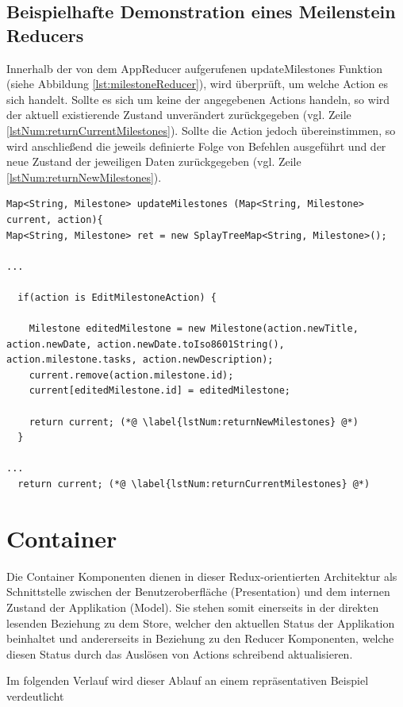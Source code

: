 \documentclass[bibliography=totoc,listof=totoc,BCOR=5mm,DIV=12,oneside]{scrbook}
\begin{document}
\subsection{Beispielhafte Demonstration eines Meilenstein Reducers}

\par Innerhalb der von dem AppReducer aufgerufenen updateMilestones Funktion (siehe Abbildung \ref{lst:milestoneReducer}), wird überprüft, um welche Action es sich handelt. Sollte es sich um keine der angegebenen Actions handeln, so wird der aktuell existierende Zustand unverändert zurückgegeben (vgl. Zeile \ref{lstNum:returnCurrentMilestones}). Sollte die Action jedoch übereinstimmen, so wird anschließend die jeweils definierte Folge von Befehlen ausgeführt und der neue Zustand der jeweiligen Daten zurückgegeben (vgl. Zeile \ref{lstNum:returnNewMilestones}).

\bigskip
\begin{lstlisting}[caption={Meilenstein Reducer Beispiel},captionpos=b, label=lst:milestoneReducer]
Map<String, Milestone> updateMilestones (Map<String, Milestone> current, action){
Map<String, Milestone> ret = new SplayTreeMap<String, Milestone>();

...

  if(action is EditMilestoneAction) {

    Milestone editedMilestone = new Milestone(action.newTitle, action.newDate, action.newDate.toIso8601String(), action.milestone.tasks, action.newDescription);
    current.remove(action.milestone.id);
    current[editedMilestone.id] = editedMilestone;

    return current; (*@ \label{lstNum:returnNewMilestones} @*)
  }
  
...
  return current; (*@ \label{lstNum:returnCurrentMilestones} @*)
\end{lstlisting}
\bigskip

\newpage
\section{Container}
\par Die Container Komponenten dienen in dieser Redux-orientierten Architektur als Schnittstelle zwischen der Benutzeroberfläche (Presentation) und dem internen Zustand der Applikation (Model). Sie stehen somit einerseits in der direkten lesenden Beziehung zu dem Store, welcher den aktuellen Status der Applikation beinhaltet und andererseits in Beziehung zu den Reducer Komponenten, welche diesen Status durch das Auslösen von Actions schreibend aktualisieren. 
\par Im folgenden Verlauf wird dieser Ablauf an einem repräsentativen Beispiel verdeutlicht
\end{document}
